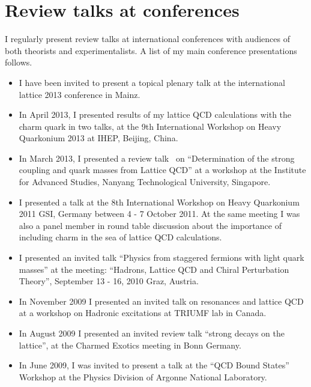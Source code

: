 \documentclass[12pt]{article}
\begin{document}
\section{Review talks at conferences}

I regularly present review talks at international
conferences with audiences of both theorists and experimentalists.
A list of my main conference presentations follows.

\begin{itemize}

\item I have been invited to present a topical plenary
      talk at the international lattice 2013 conference
      in Mainz.

\item In April 2013, I presented results of my lattice
      QCD calculations with the charm quark in two talks, at 
the 9th International Workshop on Heavy Quarkonium 2013 
at IHEP, Beijing, China.

\item In March 2013, I presented a 
review talk~\cite{McNeile:2013rga} on 
``Determination of the strong coupling and quark 
masses from Lattice QCD'' at a workshop
at the Institute for Advanced Studies, Nanyang Technological
University, Singapore.


\item I presented a talk at the 
8th International Workshop on Heavy Quarkonium 2011 
GSI, Germany between 4 - 7 October 2011. At the same meeting I
was also a panel member in round table discussion about the
importance of including charm in the sea of lattice QCD calculations.

\item I presented an invited talk 
   ``Physics from staggered fermions with light quark masses''
at the meeting:
``Hadrons, Lattice QCD and Chiral Perturbation Theory'',
September 13 - 16, 2010 Graz, Austria.

\item In November 2009 I presented an invited talk
      on resonances and lattice QCD at a
      workshop on Hadronic excitations at TRIUMF lab in Canada.

\item In August 2009 I presented an invited review talk
      ``strong decays on the lattice'',
       at the Charmed Exotics meeting in Bonn Germany.


\item In June 2009, I was invited to present a talk at 
      the ``QCD Bound States'' Workshop at
the Physics Division of Argonne National Laboratory.



\end{itemize}
\end{document}
